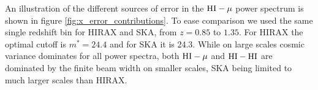 \documentclass[useAMS,usenatbib]{mnras}
\newcommand{\be}{\begin{equation}}
\newcommand{\ee}{\end{equation}}
\newcommand{\bea}{\begin{eqnarray}}
\newcommand{\eea}{\end{eqnarray}}
\begin{document}
An illustration of the different sources of error in the ${\rm HI}-\mu$ power spectrum is shown in figure \ref{fig:x_error_contributions}. To ease comparison we used the same single redshift bin for HIRAX and SKA, from $z=0.85$ to $1.35$. For HIRAX the optimal cutoff is $m^* = 24.4$ and for SKA it is 24.3. While on large scales cosmic variance dominates for all power spectra, both ${\rm HI}-\mu$ and ${\rm HI-HI}$ are dominated by the finite beam width on smaller scales, SKA being limited to much larger scales than HIRAX.

\end{document}
